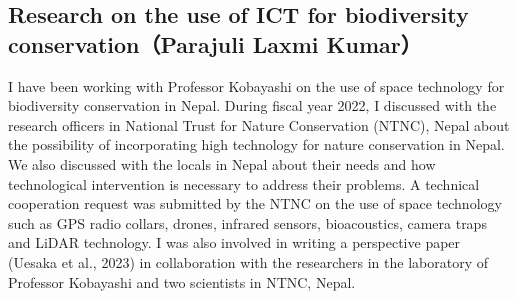 \subsection{Research on the use of ICT for biodiversity conservation（Parajuli Laxmi Kumar）}

I have been working with Professor Kobayashi on the use of space technology for biodiversity conservation in Nepal. During fiscal year 2022, I discussed with the research officers in National Trust for Nature Conservation (NTNC), Nepal about the possibility of incorporating high technology for nature conservation in Nepal. We also discussed with the locals in Nepal about their needs and how technological intervention is necessary to address their problems. A technical cooperation request was submitted by the NTNC on the use of space technology such as GPS radio collars, drones, infrared sensors, bioacoustics, camera traps and LiDAR technology. I was also involved in writing a perspective paper (Uesaka et al., 2023) in collaboration with the researchers in the laboratory of Professor Kobayashi and two scientists in NTNC, Nepal. 
 
